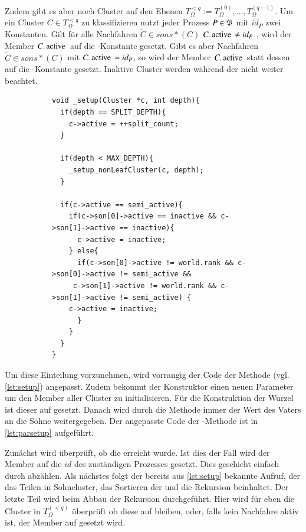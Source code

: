     Zudem gibt es aber noch Cluster auf den Ebenen $T_\Omega^{<q} := T_\Omega^{(0)},\dots,T_\Omega^{(q-1)}$. Um ein Cluster $C \in T_\Omega^{<q}$ zu klassifizieren nutzt jeder Prozess $P \in \mathfrak{P}$
    mit $id_P$ zwei Konstanten. Gilt für alle Nachfahren $\tilde C \in sons*(C)$ $C.\tcode{active} \neq id_P$  , wird der Member $C.\tcode{active}$ auf die -Konstante  gesetzt. 
    Gibt es aber Nachfahren $\tilde C \in sons*(C)$ mit $C.\tcode{active} = id_P$, so wird der Member $C.\tcode{active}$ statt dessen auf die -Konstante  gesetzt. Inaktive
    Cluster werden während der \vorruck nicht weiter beachtet. 
    
    \begin{figure}[t]
    \begin{subfigure}{0.9\textwidth}
    \begin{lstlisting}[label=lst:parsetup, caption={Für die Verteilung der Cluster auf die Prozesse angepasste \code{_setup}-Methode.}]
void _setup(Cluster *c, int depth){
  if(depth == SPLIT_DEPTH){
    c->active = ++split_count;
  }

  if(depth < MAX_DEPTH){
    _setup_nonLeafCluster(c, depth);
  }

  if(c->active == semi_active){
    if(c->son[0]->active == inactive && c->son[1]->active == inactive){
      c->active = inactive;
    } else{
      if(c->son[0]->active != world.rank && c->son[0]->active != semi_active &&
	 c->son[1]->active != world.rank && c->son[1]->active != semi_active) {
	c->active = inactive;
      }
    }
  }
}
    \end{lstlisting}
    \end{subfigure}
    \end{figure}
    Um diese Einteilung vorzunehmen, wird vorrangig der Code der Methode  (vgl. \autoref{lst:setup}) angepasst. 
    Zudem bekommt der Konstruktor  einen neuen Parameter um den Member  aller Cluster zu initialisieren. Für die Konstruktion der Wurzel ist dieser auf
     gesetzt. Danach wird durch die Methode  immer der Wert des Vaters an die Söhne weitergegeben.
    Der angepasste Code der -Methode ist in \autoref{lst:parsetup} aufgeführt.
    
    Zunächst wird überprüft, ob die  erreicht wurde. Ist dies der Fall wird der Member  auf 
    die $id$ des zuständigen Prozesses gesetzt. Dies geschieht einfach durch abzählen. Als nächstes folgt der bereits aus \autoref{lst:setup} bekannte Aufruf, der das Teilen in Sohncluster, das 
    Sortieren der  und die Rekursion beinhaltet. Der letzte Teil wird beim Abbau der Rekursion durchgeführt. Hier wird für eben die Cluster in $T_\Omega^{(<q)}$ überprüft ob diese 
    auf  bleiben, oder, falls kein Nachfahre aktiv ist, der Member  auf  gesetzt wird.
    
